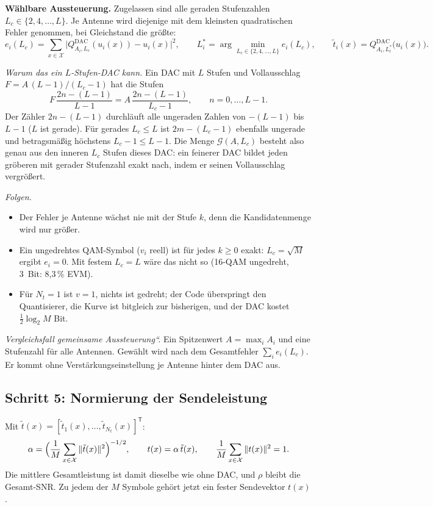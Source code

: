 \documentclass[11pt,a4paper]{article}
\newcommand{\Qd}{Q^{\mathrm{DAC}}}
\newcommand{\schritt}[1]{\subsection*{Schritt #1}}
\begin{document}
\textbf{Wählbare Aussteuerung.} Zugelassen sind alle geraden Stufenzahlen
$L_c\in\{2,4,\dots,L\}$. Je Antenne wird diejenige mit dem kleinsten quadratischen Fehler genommen,
bei Gleichstand die größte:
\begin{equation}
e_i(L_c)=\sum_{x\in\mathcal X}\bigl|\Qd_{A_i,L_c}(u_i(x))-u_i(x)\bigr|^2,\qquad
L_i^\ast=\arg\min_{L_c\in\{2,4,\dots,L\}}e_i(L_c),\qquad
\tilde t_i(x)=\Qd_{A_i,L_i^\ast}\bigl(u_i(x)\bigr).
\end{equation}

\emph{Warum das ein $L$-Stufen-DAC kann.} Ein DAC mit $L$ Stufen und Vollausschlag
$F=A\,(L-1)/(L_c-1)$ hat die Stufen
\[
F\,\frac{2n-(L-1)}{L-1}=A\,\frac{2n-(L-1)}{L_c-1},\qquad n=0,\dots,L-1 .
\]
Der Zähler $2n-(L-1)$ durchläuft alle ungeraden Zahlen von $-(L-1)$ bis $L-1$ ($L$ ist gerade). Für
gerades $L_c\le L$ ist $2m-(L_c-1)$ ebenfalls ungerade und betragsmäßig höchstens $L_c-1\le L-1$.
Die Menge $\mathcal G(A,L_c)$ besteht also genau aus den inneren $L_c$ Stufen dieses DAC: ein
feinerer DAC bildet jeden gröberen mit gerader Stufenzahl exakt nach, indem er seinen
Vollausschlag vergrößert.

\emph{Folgen.}
\begin{itemize}[leftmargin=1.4em,itemsep=0.15em,topsep=0.2em]
\item Der Fehler je Antenne wächst nie mit der Stufe $k$, denn die Kandidatenmenge wird nur größer.
\item Ein ungedrehtes QAM-Symbol ($v_i$ reell) ist für jedes $k\ge0$ exakt: $L_c=\sqrt M$ ergibt
$e_i=0$. Mit festem $L_c=L$ wäre das nicht so (16-QAM ungedreht, 3~Bit: 8{,}3\,\% EVM).
\item Für $N_t=1$ ist $v=1$, nichts ist gedreht; der Code überspringt den Quantisierer, die Kurve
ist bitgleich zur bisherigen, und der DAC kostet $\tfrac12\log_2M$ Bit.
\end{itemize}

\emph{Vergleichsfall \quotedblbase gemeinsame Aussteuerung\textquotedblleft.} Ein Spitzenwert $A=\max_iA_i$ und eine
Stufenzahl für alle Antennen. Gewählt wird nach dem Gesamtfehler $\sum_ie_i(L_c)$. Er kommt ohne
Verstärkungseinstellung je Antenne hinter dem DAC aus.

\schritt{5: Normierung der Sendeleistung}
Mit $\tilde t(x)=[\tilde t_1(x),\dots,\tilde t_{N_t}(x)]^{\mathsf T}$:
\begin{equation}
\alpha=\Bigl(\frac1M\sum_{x\in\mathcal X}\|\tilde t(x)\|^2\Bigr)^{-1/2},\qquad
t(x)=\alpha\,\tilde t(x),\qquad \frac1M\sum_{x\in\mathcal X}\|t(x)\|^2=1 .
\end{equation}
Die mittlere Gesamtleistung ist damit dieselbe wie ohne DAC, und $\rho$ bleibt die Gesamt-SNR.
Zu jedem der $M$ Symbole gehört jetzt ein fester Sendevektor $t(x)$.
\end{document}

